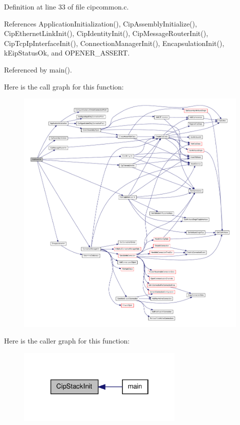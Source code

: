 \-Definition at line 33 of file cipcommon.\-c.



\-References \-Application\-Initialization(), \-Cip\-Assembly\-Initialize(), \-Cip\-Ethernet\-Link\-Init(), \-Cip\-Identity\-Init(), \-Cip\-Message\-Router\-Init(), \-Cip\-Tcp\-Ip\-Interface\-Init(), \-Connection\-Manager\-Init(), \-Encapsulation\-Init(), k\-Eip\-Status\-Ok, and \-O\-P\-E\-N\-E\-R\-\_\-\-A\-S\-S\-E\-R\-T.



\-Referenced by main().



\-Here is the call graph for this function\-:
\nopagebreak
\begin{figure}[H]
\begin{center}
\leavevmode
\includegraphics[width=350pt]{d2/dc9/group__CIP__API_ga5d4979945d124e28668b264c3823db1c_cgraph}
\end{center}
\end{figure}




\-Here is the caller graph for this function\-:
\nopagebreak
\begin{figure}[H]
\begin{center}
\leavevmode
\includegraphics[width=226pt]{d2/dc9/group__CIP__API_ga5d4979945d124e28668b264c3823db1c_icgraph}
\end{center}
\end{figure}


